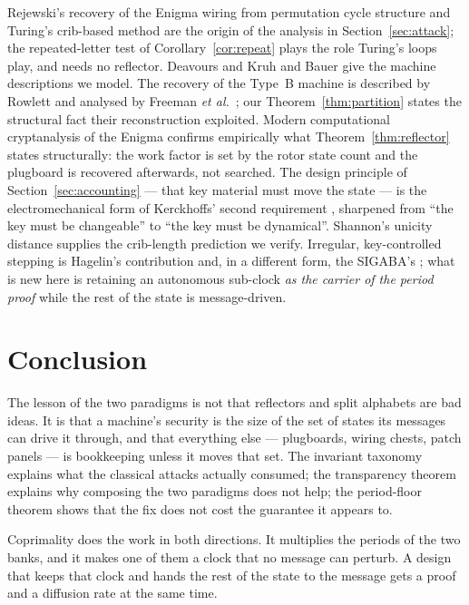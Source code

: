 \documentclass[11pt]{article}
\theoremstyle{definition}
\begin{document}
Rejewski's recovery of the Enigma wiring from permutation cycle structure
\cite{rejewski1980} and Turing's crib-based method \cite{turing1940} are the
origin of the analysis in Section~\ref{sec:attack}; the repeated-letter test of
Corollary~\ref{cor:repeat} plays the role Turing's loops play, and needs no
reflector. Deavours and Kruh \cite{deavours1985} and Bauer \cite{bauer2013} give
the machine descriptions we model. The recovery of the Type~B machine is
described by Rowlett \cite{rowlett1998} and analysed by Freeman
\emph{et al.}~\cite{freeman2003}; our Theorem~\ref{thm:partition} states the
structural fact their reconstruction exploited. Modern computational
cryptanalysis of the Enigma \cite{gillogly1995,sullivan2005,ostwald2017}
confirms empirically what Theorem~\ref{thm:reflector} states structurally: the
work factor is set by the rotor state count and the plugboard is recovered
afterwards, not searched. The design principle of Section~\ref{sec:accounting}
--- that key material must move the state --- is the electromechanical form of
Kerckhoffs' second requirement \cite{kerckhoffs1883}, sharpened from ``the key
must be changeable'' to ``the key must be dynamical''. Shannon's unicity
distance \cite{shannon1949} supplies the crib-length prediction we verify.
Irregular, key-controlled stepping is Hagelin's contribution
\cite{hagelin1994} and, in a different form, the SIGABA's
\cite{savard1999,stamp2007}; what is new here is retaining an autonomous
sub-clock \emph{as the carrier of the period proof} while the rest of the state
is message-driven.

\section{Conclusion}

The lesson of the two paradigms is not that reflectors and split alphabets are
bad ideas. It is that a machine's security is the size of the set of states its
messages can drive it through, and that everything else --- plugboards, wiring
chests, patch panels --- is bookkeeping unless it moves that set. The invariant
taxonomy explains what the classical attacks actually consumed; the transparency
theorem explains why composing the two paradigms does not help; the period-floor
theorem shows that the fix does not cost the guarantee it appears to.

Coprimality does the work in both directions. It multiplies the periods of the
two banks, and it makes one of them a clock that no message can perturb. A
design that keeps that clock and hands the rest of the state to the message gets
a proof and a diffusion rate at the same time.
\end{document}
